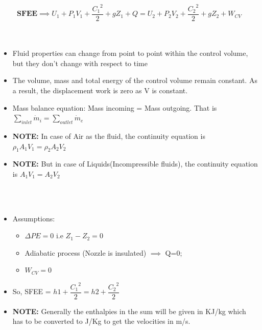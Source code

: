 \documentclass[8pt]{article}
\begin{document}
\hrulefill
\begin{center}
\subsection*{}
\end{center}
$$\boxed{\textbf{SFEE} \implies U_1 + P_1V_1 + \dfrac{{C_1}^2}{2} + gZ_1 + Q = U_2 + P_2V_2 + \dfrac{{C_2}^2}{2} + gZ_2 + W_{CV}}$$
\\\\
	\begin{itemize}
		\item Fluid properties can change from point to point within the control volume, but they don't change with respect to time
		\item The volume, mass and total energy of the control volume remain constant. As a result, the displacement work is zero as V is constant. 
		\item Mass balance equation: Mass incoming = Mass outgoing. That is $\boxed{\sum_{inlet} \dot{m}_i = \sum_{outlet}\dot{m}_e}$
		\item \textbf{NOTE:} In case of Air as the fluid, the continuity equation is $\boxed{\rho_1A_1V_1 = \rho_2A_2V_2}$ 
		\item \textbf{NOTE:} But in case of Liquids(Incompressible fluids), the continuity equation is $\boxed{A_1V_1 = A_2V_2}$
	\end{itemize}
\hrulefill\\
\\
	\begin{itemize}
		\item Assumptions:
		\begin{itemize}
			\item $\Delta PE = 0$ i.e $Z_1 - Z_2 = 0$
			\item Adiabatic process (Nozzle is insulated) $\implies$ Q=0;
			\item $W_{CV} = 0$
		\end{itemize}
		\item So, SFEE = $\boxed{h1 + \dfrac{{C_1}^2}{2} = h2 + \dfrac{{C_2}^2}{2}}$
		\item \textbf{NOTE:} Generally the enthalpies in the sum will be given in KJ/kg which has to be converted to J/Kg to get the velocities in m/s.
	\end{itemize}
\end{document}
